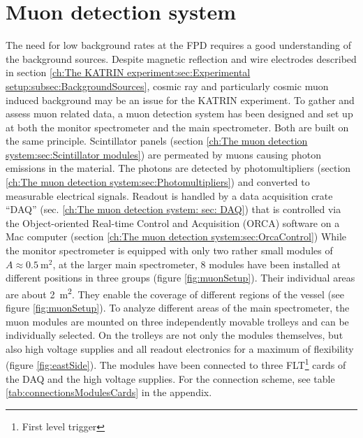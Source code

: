 
\chapter{Muon detection system}
\label{ch:The muon detection system}
  The need for low background rates at the FPD requires a good understanding of the background sources. Despite magnetic reflection and wire electrodes described in section \ref{ch:The KATRIN experiment:sec:Experimental setup:subsec:BackgroundSources}, cosmic ray and particularly cosmic muon induced background may be an issue for the KATRIN experiment. To gather and assess muon related data, a muon detection system has been designed and set up at both the monitor spectrometer and the main spectrometer. Both are built on the same principle. Scintillator panels (section \ref{ch:The muon detection system:sec:Scintillator modules}) are permeated by muons causing photon emissions in the material. The photons are detected by photomultipliers (section \ref{ch:The muon detection system:sec:Photomultipliers}) and converted to measurable electrical signals. Readout is handled by a data acquisition crate ``DAQ'' (sec. \ref{ch:The muon detection system: sec: DAQ}) that is controlled via the Object-oriented Real-time Control and Acquisition\cite{How09} (ORCA) software on a Mac computer (section \ref{ch:The muon detection system:sec:OrcaControl})
  While the monitor spectrometer is equipped with only two rather small modules of $A \approx \SI{0.5}{\square\meter}$, at the larger main spectrometer, 8 modules have been installed at different positions in three groups (figure \ref{fig:muonSetup}). Their individual areas are about \SI{2}{\square\meter}. They enable the coverage of different regions of the vessel (see figure \ref{fig:muonSetup}). To analyze different areas of the main spectrometer, the muon modules are mounted on three independently movable trolleys and can be individually selected. On the trolleys are not only the modules themselves, but also high voltage supplies and all readout electronics for a maximum of flexibility (figure \ref{fig:eastSide}).
  The modules have been connected to three FLT\footnote{First level trigger} cards of the DAQ and the high voltage supplies. For the connection scheme, see table \ref{tab:connectionsModulesCards} in the appendix.
  
